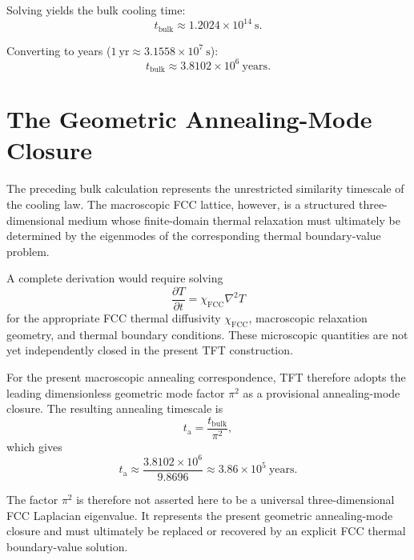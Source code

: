 Solving yields the bulk cooling time:
\begin{equation}
    t_{\mathrm{bulk}} \approx 1.2024 \times 10^{14}\ \mathrm{s}.
\end{equation}

Converting to years ($1\ \mathrm{yr} \approx 3.1558 \times 10^7\ \mathrm{s}$):
\begin{equation}
    t_{\mathrm{bulk}} \approx 3.8102 \times 10^6\ \mathrm{years}.
\end{equation}


\section{The Geometric Annealing-Mode Closure}

The preceding bulk calculation represents the unrestricted similarity timescale of the cooling law. The macroscopic FCC lattice, however, is a structured three-dimensional medium whose finite-domain thermal relaxation must ultimately be determined by the eigenmodes of the corresponding thermal boundary-value problem.

A complete derivation would require solving
\begin{equation}
    \frac{\partial T}{\partial t} = \chi_{\mathrm{FCC}}\nabla^2 T
\end{equation}
for the appropriate FCC thermal diffusivity $\chi_{\mathrm{FCC}}$, macroscopic relaxation geometry, and thermal boundary conditions. These microscopic quantities are not yet independently closed in the present TFT construction.

For the present macroscopic annealing correspondence, TFT therefore adopts the leading dimensionless geometric mode factor $\pi^2$ as a provisional annealing-mode closure. The resulting annealing timescale is
\begin{equation}
    t_{\mathrm a} = \frac{t_{\mathrm{bulk}}}{\pi^2},
\end{equation}
which gives
\begin{equation}
    t_{\mathrm a} \approx \frac{3.8102 \times 10^6}{9.8696} \approx 3.86 \times 10^5\ \mathrm{years}.
\end{equation}

The factor $\pi^2$ is therefore not asserted here to be a universal three-dimensional FCC Laplacian eigenvalue. It represents the present geometric annealing-mode closure and must ultimately be replaced or recovered by an explicit FCC thermal boundary-value solution.


